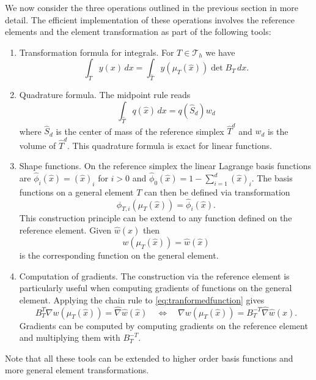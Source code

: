 \documentclass[a4paper,12pt]{article}
\begin{document}
We now consider the three operations outlined in the previous section
in more detail. The efficient implementation of these operations involves
the reference elements and the element transformation as part of the following
tools:
\begin{enumerate}[Tool 1)]
\item Transformation formula for integrals. For $T\in\mathcal{T}_h$ we have
\begin{equation*}
\int_T y(x)\,dx = \int_{\hat T} y(\mu_T(\hat x)) \det B_T \,dx .
\end{equation*}
\item Quadrature formula. The midpoint rule reads
\begin{equation*}
\int_{\hat T} q(\hat x) \,dx = q(\hat S_d) w_d
\end{equation*}
where $\hat S_d$ is the center of mass of the reference simplex $\hat T^d$
and $w_d$ is the volume of $\hat T^d$. This quadrature formula is exact for linear
functions.
\item Shape functions. On the reference simplex the linear Lagrange
basis functions are $\hat\phi_i(\hat x) = (\hat x)_i$ for $i>0$ and 
$\hat\phi_0(\hat x) = 1-\sum_{i=1}^d (\hat x)_i$. The basis functions
on a general element $T$ can then be defined via transformation
\begin{equation*}
\phi_{T,i}(\mu_T(\hat x)) = \hat\phi_i(\hat x) .
\end{equation*}
This construction principle can be extend to any function defined on the
reference element. Given $\hat w(\hat x)$ then 
\begin{equation}
w(\mu_T(\hat x))=\hat w(\hat x)
\label{eq:tranformedfunction}
\end{equation}
is the corresponding function on the general element.
\item Computation of gradients. The construction via the reference element
is particularly useful when computing gradients of functions on the general element.
Applying the chain rule to \eqref{eq:tranformedfunction} gives
\begin{equation*}
B_T^T \nabla w(\mu_T(\hat x)) = \hat\nabla \hat w(\hat x) \quad\Leftrightarrow\quad
\nabla w(\mu_T(\hat x)) = B_T^{-T}\hat\nabla \hat w(\hat x) .
\end{equation*}
Gradients can be computed by computing gradients on the reference element
and multiplying them with $B_T^{-T}$.
\end{enumerate}
Note that all these tools can be extended to higher order basis functions
and more general element transformations.
\end{document}
